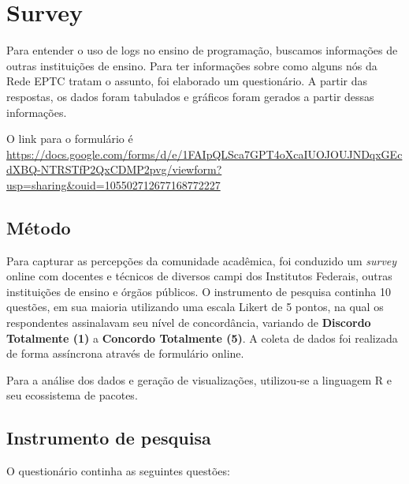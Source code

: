 \chapter{Survey}

Para entender o uso de logs no ensino de programação, buscamos informações de outras instituições de ensino. Para ter informações sobre como alguns nós da Rede EPTC tratam o assunto, foi elaborado um questionário. A partir das respostas, os dados foram tabulados e gráficos foram gerados a partir dessas informações. 

O link para o formulário é \url{https://docs.google.com/forms/d/e/1FAIpQLSca7GPT4oXcaIUOJOUJNDqxGEcdXBQ-NTRSTfP2QxCDMP2pvg/viewform?usp=sharing&ouid=105502712677168772227}

%

\section{Método}

Para capturar as percepções da comunidade acadêmica, foi conduzido um \textit{survey} online com docentes e técnicos de diversos campi dos Institutos Federais, outras instituições de ensino e órgãos públicos. O instrumento de pesquisa continha 10 questões, em sua maioria utilizando uma escala Likert de 5 pontos, na qual os respondentes assinalavam seu nível de concordância, variando de \textbf{Discordo Totalmente (1)} a \textbf{Concordo Totalmente (5)}. A coleta de dados foi realizada de forma assíncrona através de formulário online.

Para a análise dos dados e geração de visualizações, utilizou-se a linguagem R e seu ecossistema de pacotes.

\section{Instrumento de pesquisa}
O questionário continha as seguintes questões:

